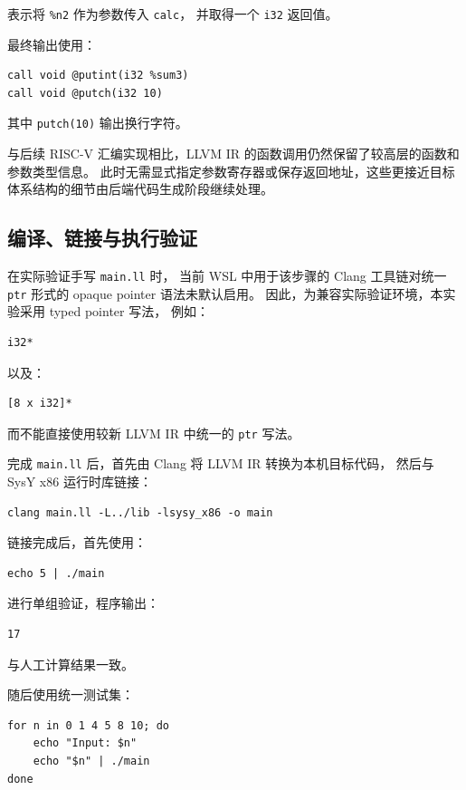 \documentclass[12pt,a4paper]{ctexart}
\begin{document}
表示将 \texttt{\%n2} 作为参数传入 \texttt{calc}，
并取得一个 \texttt{i32} 返回值。

最终输出使用：

\begin{lstlisting}
call void @putint(i32 %sum3)
call void @putch(i32 10)
\end{lstlisting}

其中 \texttt{putch(10)} 输出换行字符。

与后续 RISC-V 汇编实现相比，LLVM IR 的函数调用仍然保留了较高层的函数和参数类型信息。
此时无需显式指定参数寄存器或保存返回地址，这些更接近目标体系结构的细节由后端代码生成阶段继续处理。


\subsection{编译、链接与执行验证}

在实际验证手写 \texttt{main.ll} 时，
当前 WSL 中用于该步骤的 Clang 工具链对统一
\texttt{ptr} 形式的 opaque pointer 语法未默认启用。
因此，为兼容实际验证环境，本实验采用 typed pointer 写法，
例如：

\begin{lstlisting}
i32*
\end{lstlisting}

以及：

\begin{lstlisting}
[8 x i32]*
\end{lstlisting}

而不能直接使用较新 LLVM IR 中统一的 \texttt{ptr} 写法。

完成 \texttt{main.ll} 后，首先由 Clang 将 LLVM IR 转换为本机目标代码，
然后与 SysY x86 运行时库链接：

\begin{lstlisting}
clang main.ll -L../lib -lsysy_x86 -o main
\end{lstlisting}

链接完成后，首先使用：

\begin{lstlisting}
echo 5 | ./main
\end{lstlisting}

进行单组验证，程序输出：

\begin{lstlisting}
17
\end{lstlisting}

与人工计算结果一致。

随后使用统一测试集：

\begin{lstlisting}
for n in 0 1 4 5 8 10; do
    echo "Input: $n"
    echo "$n" | ./main
done
\end{lstlisting}
\end{document}
